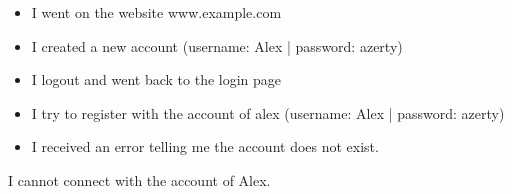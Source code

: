 \documentclass[a4paper,article,oneside]{memoir}
\begin{document}
\noindent{}

\begin{itemize}
  \item I went on the website www.example.com
  \item I created a new account (username: Alex | password: azerty)
  \item I logout and went back to the login page
  \item I try to register with the account of alex (username: Alex | password: azerty)
  \item I received an error telling me the account does not exist.
\end{itemize}

\noindent{}

I cannot connect with the account of Alex.

\printglossary[nonumberlist]
\end{document}
